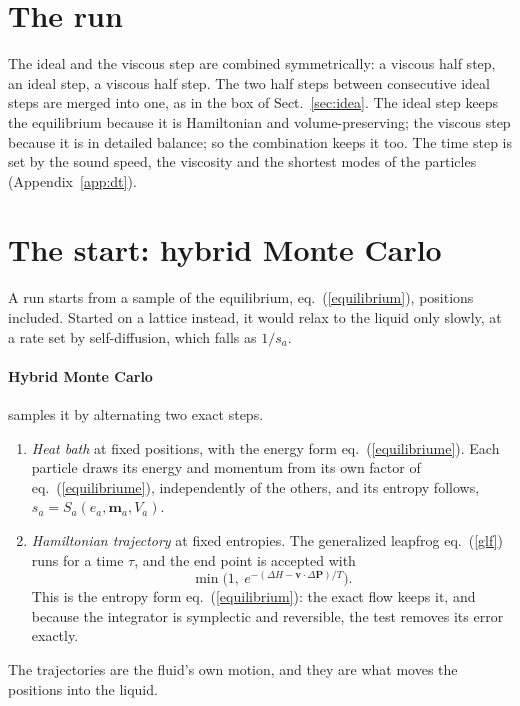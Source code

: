 \documentclass[11pt,aps,preprint,nofootinbib,superscriptaddress,tightenlines]{revtex4-2}
\def\st{\begin{equation}}
\def\stp{\end{equation}}
\def\Eq#1{eq.~(\ref{#1})}
\def\Sect#1{Sect.~\ref{#1}}
\def\App#1{Appendix~\ref{#1}}
\let\oldparagraph\paragraph
\renewcommand{\paragraph}{\par\bigskip\oldparagraph}
\begin{document}
\section{The run}
\label{sec:run}

The ideal and the viscous step are combined symmetrically: a viscous half step, an ideal step, a viscous half step.  The two half steps
between consecutive ideal steps are merged into one, as in the box of \Sect{sec:idea}.  The ideal step keeps the equilibrium because it is
Hamiltonian and volume-preserving; the viscous step because it is in detailed balance; so the combination keeps it too.  The time step is
set by the sound speed, the viscosity and the shortest modes of the particles (\App{app:dt}).

\section{The start: hybrid Monte Carlo}
\label{sec:start}

A run starts from a sample of the equilibrium, \Eq{equilibrium}, positions included.  Started on a lattice instead, it would relax to the
liquid only slowly, at a rate set by self-diffusion, which falls as $1/s_a$.

\paragraph{Hybrid Monte Carlo} samples it by alternating two exact steps.
\begin{enumerate}
\item \emph{Heat bath} at fixed positions, with the energy form \Eq{equilibriume}.  Each particle draws its energy and momentum from its own
  factor of \Eq{equilibriume}, independently of the others, and its entropy follows, $s_a=S_a(e_a,\bm m_a,V_a)$.
\item \emph{Hamiltonian trajectory} at fixed entropies.  The generalized leapfrog \Eq{glf} runs for a time $\tau$, and the end point is accepted with
  \st
  \min\Big(1,\ e^{-(\Delta H-\bm v\cdot\Delta\bm P)/T}\Big) .
  \stp
  This is the entropy form \Eq{equilibrium}: the exact flow keeps it, and because the integrator is symplectic and reversible, the test removes
  its error exactly.
\end{enumerate}
The trajectories are the fluid's own motion, and they are what moves the positions into the liquid.
\end{document}
